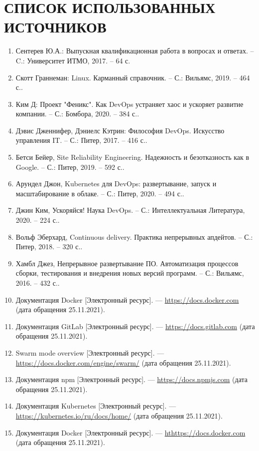 \section*{СПИСОК ИСПОЛЬЗОВАННЫХ ИСТОЧНИКОВ}

\begin{enumerate}
    \item Сентерев Ю.А.: Выпускная квалификационная работа в вопросах и ответах. – C.: Университет ИТМО, 2017. – 64 с.
    \item Скотт Граннеман: Linux. Карманный справочник. – С.: Вильямс, 2019. – 464 с..
    \item Ким Д: Проект "Феникс". Как DevOps устраняет хаос и ускоряет развитие компании. – С.: Бомбора, 2020. – 384 с..
    \item Дэвис Дженнифер, Дэниелс Кэтрин: Философия DevOps. Искусство управления IT. – С.: Питер, 2017. – 416 с..
    \item Бетси Бейер, Site Reliability Engineering. Надежность и безотказность как в Google. – С.: Питер, 2019. – 592 с..
    \item Арундел Джон, Kubernetes для DevOps: развертывание, запуск и масштабирование в облаке. – С.: Питер, 2020. – 494 с..
    \item Джин Ким, Ускоряйся! Наука DevOps. – С.: Интеллектуальная Литература, 2020. – 224 с..
    \item Вольф Эберхард, Continuous delivery. Практика непрерывных апдейтов. – С.: Питер, 2018. – 320 с..
    \item Хамбл Джез, Непрерывное развертывание ПО. Автоматизация процессов сборки, тестирования и внедрения новых версий программ. – С.: Вильямс, 2016. – 432 с..
    \item Документация Docker [Электронный ресурс]. — \url{https://docs.docker.com} (дата обращения 25.11.2021).
    \item Документация GitLab [Электронный ресурс]. — \url{https://docs.gitlab.com} (дата обращения 25.11.2021).
    \item Swarm mode overview [Электронный ресурс]. — \url{https://docs.docker.com/engine/swarm/} (дата обращения 25.11.2021).
    \item Документация npm [Электронный ресурс]. — \url{https://docs.npmjs.com} (дата обращения 25.11.2021).
    \item Документация Kubernetes [Электронный ресурс]. — \url{https://kubernetes.io/ru/docs/home/} (дата обращения 25.11.2021).
    \item Документация Docker [Электронный ресурс]. — \url{hthttps://docs.docker.com} (дата обращения 25.11.2021).

\end{enumerate}
